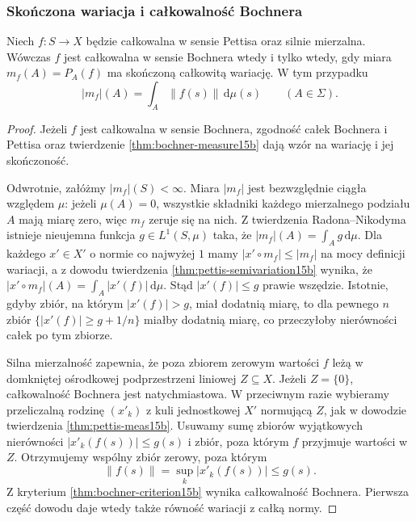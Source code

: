 \subsubsection{Skończona wariacja i całkowalność Bochnera}

\begin{twierdzenie}
\label{thm:pettis-variation-bochner15b}
Niech $f:S\to X$ będzie całkowalna w sensie Pettisa
oraz silnie mierzalna. Wówczas $f$ jest całkowalna
w sensie Bochnera wtedy i tylko wtedy, gdy miara
$m_f(A)=P_A(f)$ ma skończoną całkowitą wariację.
W tym przypadku
\[
 |m_f|(A)=\int_A\|f(s)\|\,\mathrm d\mu(s)
 \qquad(A\in\Sigma).
\]
\end{twierdzenie}
\begin{proof}
Jeżeli $f$ jest całkowalna w sensie Bochnera,
zgodność całek Bochnera i Pettisa oraz twierdzenie
\ref{thm:bochner-measure15b} dają wzór na wariację
i jej skończoność.

Odwrotnie, załóżmy $|m_f|(S)<\infty$.
Miara $|m_f|$ jest bezwzględnie ciągła względem
$\mu$: jeżeli $\mu(A)=0$, wszystkie składniki
każdego mierzalnego podziału $A$ mają miarę zero,
więc $m_f$ zeruje się na nich.
Z twierdzenia Radona--Nikodyma istnieje nieujemna
funkcja $g\in L^1(S,\mu)$ taka, że
$|m_f|(A)=\int_Ag\,\mathrm d\mu$.
Dla każdego $x'\in X'$ o normie co najwyżej $1$
mamy $|x'\circ m_f|\le |m_f|$ na mocy definicji
wariacji, a z dowodu twierdzenia
\ref{thm:pettis-semivariation15b} wynika, że
$|x'\circ m_f|(A)=\int_A|x'(f)|\,\mathrm d\mu$.
Stąd $|x'(f)|\le g$ prawie wszędzie.
Istotnie, gdyby zbiór, na którym $|x'(f)|>g$,
miał dodatnią miarę, to dla pewnego $n$ zbiór
$\{|x'(f)|\ge g+1/n\}$ miałby dodatnią miarę,
co przeczyłoby nierówności całek po tym zbiorze.

Silna mierzalność zapewnia, że poza zbiorem zerowym
wartości $f$ leżą w domkniętej ośrodkowej
podprzestrzeni liniowej $Z\subseteq X$. Jeżeli
$Z=\{0\}$, całkowalność Bochnera jest natychmiastowa.
W przeciwnym razie wybieramy przeliczalną rodzinę
$(x'_k)$ z kuli jednostkowej $X'$ normującą $Z$,
jak w dowodzie twierdzenia \ref{thm:pettis-meas15b}.
Usuwamy sumę zbiorów wyjątkowych nierówności
$|x'_k(f(s))|\le g(s)$ i zbiór, poza którym $f$
przyjmuje wartości w $Z$. Otrzymujemy wspólny zbiór
zerowy, poza którym
\[
 \|f(s)\|=\sup_k|x'_k(f(s))|\le g(s).
\]
Z kryterium \ref{thm:bochner-criterion15b} wynika
całkowalność Bochnera. Pierwsza część dowodu daje
wtedy także równość wariacji z całką normy.
\end{proof}

